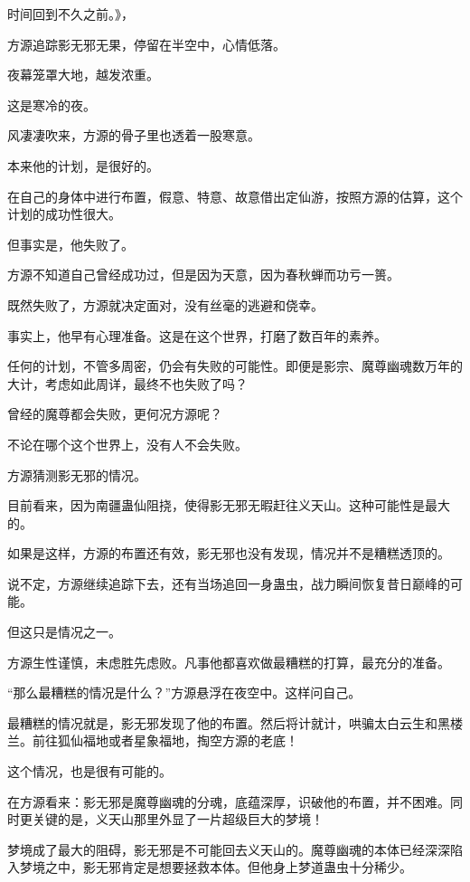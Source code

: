 
\begin{this_body}

时间回到不久之前。》，

方源追踪影无邪无果，停留在半空中，心情低落。

夜幕笼罩大地，越发浓重。

这是寒冷的夜。

风凄凄吹来，方源的骨子里也透着一股寒意。

本来他的计划，是很好的。

在自己的身体中进行布置，假意、特意、故意借出定仙游，按照方源的估算，这个计划的成功性很大。

但事实是，他失败了。

方源不知道自己曾经成功过，但是因为天意，因为春秋蝉而功亏一篑。

既然失败了，方源就决定面对，没有丝毫的逃避和侥幸。

事实上，他早有心理准备。这是在这个世界，打磨了数百年的素养。

任何的计划，不管多周密，仍会有失败的可能性。即便是影宗、魔尊幽魂数万年的大计，考虑如此周详，最终不也失败了吗？

曾经的魔尊都会失败，更何况方源呢？

不论在哪个这个世界上，没有人不会失败。

方源猜测影无邪的情况。

目前看来，因为南疆蛊仙阻挠，使得影无邪无暇赶往义天山。这种可能性是最大的。

如果是这样，方源的布置还有效，影无邪也没有发现，情况并不是糟糕透顶的。

说不定，方源继续追踪下去，还有当场追回一身蛊虫，战力瞬间恢复昔日巅峰的可能。

但这只是情况之一。

方源生性谨慎，未虑胜先虑败。凡事他都喜欢做最糟糕的打算，最充分的准备。

“那么最糟糕的情况是什么？”方源悬浮在夜空中。这样问自己。

最糟糕的情况就是，影无邪发现了他的布置。然后将计就计，哄骗太白云生和黑楼兰。前往狐仙福地或者星象福地，掏空方源的老底！

这个情况，也是很有可能的。

在方源看来：影无邪是魔尊幽魂的分魂，底蕴深厚，识破他的布置，并不困难。同时更关键的是，义天山那里外显了一片超级巨大的梦境！

梦境成了最大的阻碍，影无邪是不可能回去义天山的。魔尊幽魂的本体已经深深陷入梦境之中，影无邪肯定是想要拯救本体。但他身上梦道蛊虫十分稀少。


\end{this_body}

